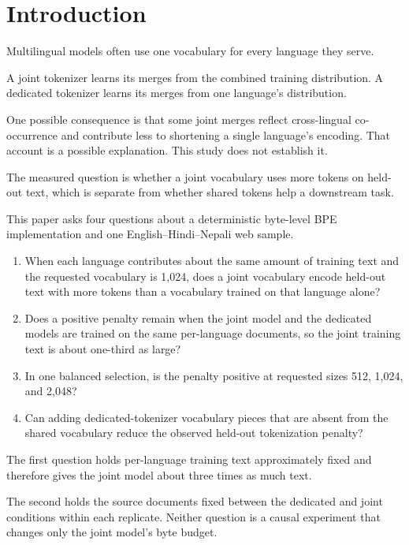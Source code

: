 \documentclass[10pt,twocolumn]{article}
\begin{document}
\section{Introduction}

Multilingual models often use one vocabulary for every
language they serve.

A joint tokenizer learns its merges from the combined
training distribution. A dedicated tokenizer learns its
merges from one language's distribution.

One possible consequence is that some joint merges reflect
cross-lingual co-occurrence and contribute less to shortening
a single language's encoding. That account is a possible
explanation. This study does not establish it.

The measured question is whether a joint vocabulary uses
more tokens on held-out text, which is separate from whether
shared tokens help a downstream task.

This paper asks four questions about a deterministic
byte-level BPE implementation and one English--Hindi--Nepali
web sample.

\begin{enumerate}

\item When each language contributes about the same amount
of training text and the requested vocabulary is 1,024,
does a joint vocabulary encode held-out text with more
tokens than a vocabulary trained on that language alone?

\item Does a positive penalty remain when the joint model
and the dedicated models are trained on the same
per-language documents, so the joint training text is
about one-third as large?

\item In one balanced selection, is the penalty positive
at requested sizes 512, 1,024, and 2,048?

\item Can adding dedicated-tokenizer vocabulary pieces
that are absent from the shared vocabulary reduce the
observed held-out tokenization penalty?

\end{enumerate}

The first question holds per-language training text
approximately fixed and therefore gives the joint model
about three times as much text.

The second holds the source documents fixed between the
dedicated and joint conditions within each replicate.
Neither question is a causal experiment that changes only
the joint model's byte budget.
\end{document}
